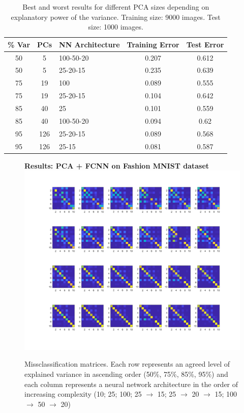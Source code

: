 \documentclass[letterpaper,12pt]{article}
\begin{document}
\begin{table}[p]
\centering
  \begin{tabular}{|cc|l|c|c|}
  	\hline
    \% Var & PCs & NN Architecture & Training Error & Test Error \\
    \hline
    \hline
    50 & 5 & 100-50-20 & 0.207    & 0.612\\
    50& 5 & 25-20-15 & 0.235    & 0.639\\
    \hline
    75 & 19 &  100 & 0.089    & 0.555\\
    75 & 19& 25-20-15 & 0.104    & 0.642\\
    \hline
    85 & 40 & 25 & 0.101   &  0.559\\
    85 & 40 & 100-50-20 & 0.094     & 0.62\\
    \hline
    95 & 126 & 25-20-15 & 0.089   &  0.568\\
    95 & 126 & 25-15 & 0.081   &  0.587\\
    \hline
  \end{tabular}
    \vspace{0.5em}
  \caption{Best and worst results for different PCA sizes depending on explanatory power of the variance. Training size: 9000 images. Test size: 1000 images.}
\end{table}

\begin{figure}[p]
\centering
\textbf{Results: PCA + FCNN on Fashion MNIST dataset}
  \includegraphics[width=0.9\linewidth]{PCA_1DNN_Fashion_MNIST}
\caption{Missclassification matrices. Each row represents an agreed level of explained variance in ascending order (50\%, 75\%, 85\%, 95\%) and each column represents a neural network architecture in the order of increasing complexity (10; 25; 100; 25 $\rightarrow$ 15; 25 $\rightarrow$ 20 $\rightarrow$ 15; 100 $\rightarrow$ 50 $\rightarrow$ 20)}
\label{fig:PCA_1DNN_Fashion_MNIST}
\end{figure}
\end{document}
